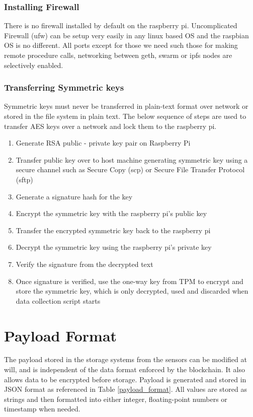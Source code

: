 \documentclass[11pt,openright]{report}
\begin{document}
\subsubsection{Installing Firewall}
There is no firewall installed by default on the raspberry pi. Uncomplicated Firewall (ufw) can be setup very easily in any linux based OS and the raspbian OS is no different. All ports except for those we need such those for making remote procedure calls, networking between geth, swarm or ipfs nodes are selectively enabled.

\subsubsection{Transferring Symmetric keys}
Symmetric keys must never be transferred in plain-text format over network or stored in the file system in plain text. The below sequence of steps are used to transfer AES keys over a network and lock them to the raspberry pi.

\begin{enumerate}
	\item Generate RSA public - private key pair on Raspberry Pi
	\item Transfer public key over to host machine generating symmetric key using a secure channel such as Secure Copy (scp) or Secure File Transfer Protocol (sftp)
	\item Generate a signature hash for the key
	\item Encrypt the symmetric key with the raspberry pi's public key
	\item Transfer the encrypted symmetric key back to the raspberry pi
	\item Decrypt the symmetric key using the raspberry pi's private key
	\item Verify the signature from the decrypted text
	\item Once signature is verified, use the one-way key from TPM to encrypt and store the symmetric key, which is only decrypted, used and discarded when data collection script starts
\end{enumerate}

\section{Payload Format} \label{ss:payload format}
The payload stored in the storage systems from the sensors can be modified at will, and is independent of the data format enforced by the blockchain. It also allows data to be encrypted before storage. Payload is generated and stored in JSON format as referenced in Table \ref{payload_format}. All values are stored as strings and then formatted into either integer, floating-point numbers or timestamp when needed.
\newpage
\end{document}
